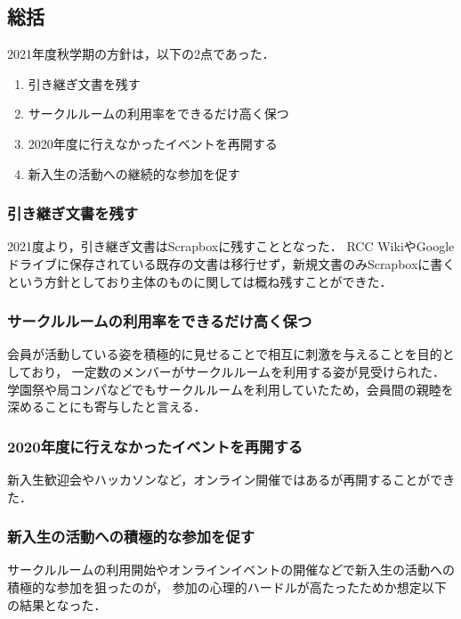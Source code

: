 \subsection*{\thirdGrade{}総括}



2021年度秋学期の\thirdGrade{}方針は，以下の2点であった．

\begin{enumerate}
    \item 引き継ぎ文書を残す
    \item サークルルームの利用率をできるだけ高く保つ
    \item 2020年度に行えなかったイベントを再開する
    \item 新入生の活動への継続的な参加を促す
\end{enumerate}


\subsubsection*{引き継ぎ文書を残す}

2021度より，引き継ぎ文書はScrapboxに残すこととなった．
RCC WikiやGoogleドライブに保存されている既存の文書は移行せず，新規文書のみScrapboxに書くという方針としており\thirdGrade{}主体のものに関しては概ね残すことができた．

\subsubsection*{サークルルームの利用率をできるだけ高く保つ}

会員が活動している姿を積極的に見せることで相互に刺激を与えることを目的としており，
一定数のメンバーがサークルルームを利用する姿が見受けられた．
学園祭や局コンパなどでもサークルルームを利用していたため，会員間の親睦を深めることにも寄与したと言える．

\subsubsection*{2020年度に行えなかったイベントを再開する}

新入生歓迎会やハッカソンなど，オンライン開催ではあるが再開することができた．

\subsubsection*{新入生の活動への積極的な参加を促す}

サークルルームの利用開始やオンラインイベントの開催などで新入生の活動への積極的な参加を狙ったのが，
参加の心理的ハードルが高たったためか想定以下の結果となった．

